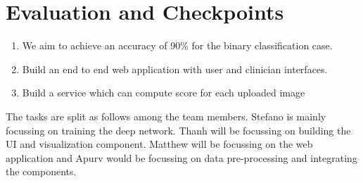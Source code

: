 \documentclass[a4paper,10pt]{article}
\begin{document}
\section{Evaluation and Checkpoints}

\begin{enumerate}
 \item We aim to achieve an accuracy of 90\% for the binary classification case.
 \item Build an end to end web application with user and clinician interfaces.
 \item Build a service which can compute score for each uploaded image
\end{enumerate}
The tasks are split as follows among the team members. Stefano is mainly focussing on training the deep network. Thanh will be focussing on 
building the UI and visualization component. Matthew will be focussing on the web application and Apurv would be focussing on data pre-processing
and integrating the components.


\end{document}
